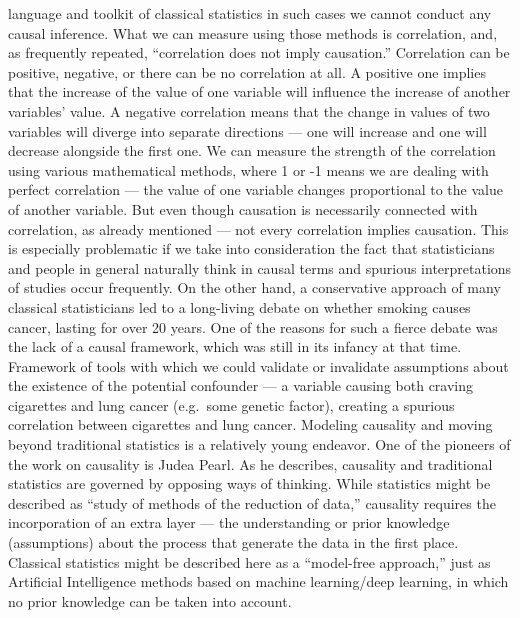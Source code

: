 \documentclass[
  10pt,
  dvipsnames,enabledeprecatedfontcommands]{scrartcl}
\begin{document}
language and toolkit of classical statistics in such cases we cannot
conduct any causal inference. What we can measure using those methods is
correlation, and, as frequently repeated, ``correlation does not imply
causation.'' Correlation can be positive, negative, or there can be no
correlation at all. A positive one implies that the increase of the
value of one variable will influence the increase of another variables'
value. A negative correlation means that the change in values of two
variables will diverge into separate directions --- one will increase
and one will decrease alongside the first one. We can measure the
strength of the correlation using various mathematical methods, where 1
or -1 means we are dealing with perfect correlation --- the value of one
variable changes proportional to the value of another variable. But even
though causation is necessarily connected with correlation, as already
mentioned --- not every correlation implies causation. This is
especially problematic if we take into consideration the fact that
statisticians and people in general naturally think in causal terms and
spurious interpretations of studies occur frequently. On the other hand,
a conservative approach of many classical statisticians led to a
long-living debate on whether smoking causes cancer, lasting for over 20
years. One of the reasons for such a fierce debate was the lack of a
causal framework, which was still in its infancy at that time. Framework
of tools with which we could validate or invalidate assumptions about
the existence of the potential confounder --- a variable causing both
craving cigarettes and lung cancer (e.g.~some genetic factor), creating
a spurious correlation between cigarettes and lung cancer. Modeling
causality and moving beyond traditional statistics is a relatively young
endeavor. One of the pioneers of the work on causality is Judea Pearl.
As he describes, causality and traditional statistics are governed by
opposing ways of thinking. While statistics might be described as
``study of methods of the reduction of data,'' causality requires the
incorporation of an extra layer --- the understanding or prior knowledge
(assumptions) about the process that generate the data in the first
place. Classical statistics might be described here as a ``model-free
approach,'' just as Artificial Intelligence methods based on machine
learning/deep learning, in which no prior knowledge can be taken into
account.
\end{document}
